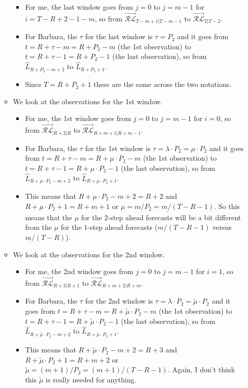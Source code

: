 \documentclass[11pt]{article}
\begin{document}
\begin{itemize}
\begin{itemize}
\begin{itemize}
\item For me, the last window goes from $j=0$ to $j=m-1$ for $i=T-R+2-1-m$, so from $\overrightarrow{\mathcal{RL}}_{T-m+1|T-m-1}$ to $\overrightarrow{\mathcal{RL}}_{T|T-2}$.
\item For Barbara, the $\tau$ for the last window is $\tau=P_{2}$ and it goes from $t=R+\tau-m=R+P_{2}-m$ (the 1st observation) to $t=R+\tau-1=R+P_{2}-1$ (the last observation), so from $\widehat{L}_{R+P_{2}-m+2}$ to $\widehat{L}_{R+P_{2}+1}$. 
\item Since $T=R+P_{2}+1$ these are the same across the two notations.
\end{itemize}
\item We look at the observations for the 1st window.
\begin{itemize}
\item For me, the 1st window goes from $j=0$ to $j=m-1$ for $i=0$, so from $\overrightarrow{\mathcal{RL}}_{R+2|R}$ to $\overrightarrow{\mathcal{RL}}_{R+m+1|R+m-1}$.
\item For Barbara, the $\tau$ for the 1st window is $\tau=\lambda\cdot P_{2}=\mu\cdot P_{2}$ and it goes from $t=R+\tau-m=R+\mu\cdot P_{2}-m$ (the 1st observation) to $t=R+\tau-1=R+\mu\cdot P_{2}-1$ (the last observation), so from $\widehat{L}_{R+\mu\cdot P_{2}-m+2}$ to $\widehat{L}_{R+\mu\cdot P_{2}+1}$. 
\item This means that $R+\mu\cdot P_{2}-m+2=R+2$ and $R+\mu\cdot P_{2}+1=R+m+1$ or $\underline{\mu=m/P_{2}=m/(T-R-1)}$. So this means that the $\mu$ for the $2$-step ahead forecasts will be a bit different from the $\mu$ for the $1$-step ahead forecasts ($m/(T-R-1)$ versus $m/(T-R)$).
\end{itemize}
\item We look at the observations for the 2nd window.
\begin{itemize}
\item For me, the 2nd window goes from $j=0$ to $j=m-1$ for $i=1$, so from $\overrightarrow{\mathcal{RL}}_{R+3|R+1}$ to $\overrightarrow{\mathcal{RL}}_{R+m+2|R+m}$.
\item For Barbara, the $\tau$ for the 2nd window is $\tau=\lambda\cdot P_{2}=\widetilde{\mu}\cdot P_{2}$ and it goes from $t=R+\tau-m=R+\widetilde{\mu}\cdot P_{2}-m$ (the 1st observation) to $t=R+\tau-1=R+\widetilde{\mu}\cdot P_{2}-1$ (the last observation), so from $\widehat{L}_{R+\widetilde{\mu}\cdot P_{2}-m+2}$ to $\widehat{L}_{R+\widetilde{\mu}\cdot P_{2}+1}$. 
\item This means that $R+\widetilde{\mu}\cdot P_{2}-m+2=R+3$ and $R+\widetilde{\mu}\cdot P_{2}+1=R+m+2$ or $\widetilde{\mu}=(m+1)/P_{2}=(m+1)/(T-R-1)$. Again, I don't think this $\widetilde{\mu}$ is really needed for anything.

\end{itemize}
\end{itemize}
\end{itemize}
\end{document}
